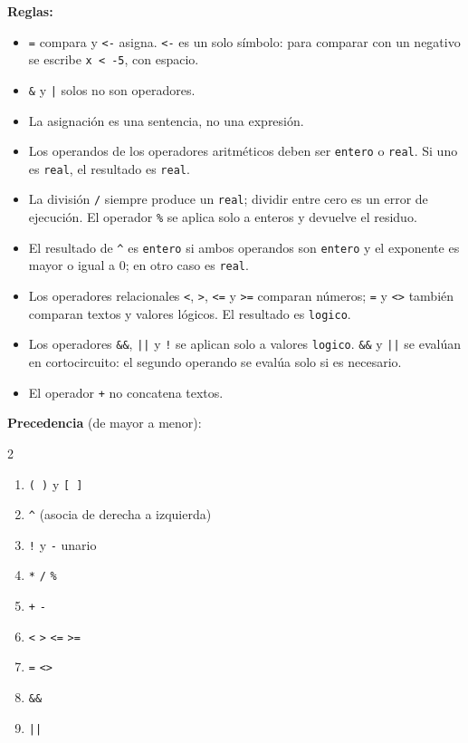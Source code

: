 \documentclass[spanish,11pt,letterpaper]{article}
\begin{document}
	\textbf{Reglas:}
	\begin{itemize}
		\item \texttt{=} compara y \texttt{<-} asigna. \texttt{<-} es un solo
		s\'imbolo: para comparar con un negativo se escribe
		\texttt{x < -5}, con espacio.
		\item \texttt{\&} y \texttt{|} solos no son operadores.
		\item La asignaci\'on es una sentencia, no una expresi\'on.
		\item Los operandos de los operadores aritm\'eticos deben ser
		\texttt{entero} o \texttt{real}. Si uno es \texttt{real}, el
		resultado es \texttt{real}.
		\item La divisi\'on \texttt{/} siempre produce un \texttt{real}; dividir
		entre cero es un error de ejecuci\'on. El operador \texttt{\%}
		se aplica solo a enteros y devuelve el residuo.
		\item El resultado de \texttt{\textasciicircum} es \texttt{entero} si
		ambos operandos son \texttt{entero} y el exponente es mayor o
		igual a 0; en otro caso es \texttt{real}.
		\item Los operadores relacionales \texttt{<}, \texttt{>}, \texttt{<=} y
		\texttt{>=} comparan n\'umeros; \texttt{=} y \texttt{<>} tambi\'en
		comparan textos y valores l\'ogicos. El resultado es
		\texttt{logico}.
		\item Los operadores \texttt{\&\&}, \texttt{||} y \texttt{!} se aplican
		solo a valores \texttt{logico}. \texttt{\&\&} y \texttt{||} se
		eval\'uan en cortocircuito: el segundo operando se eval\'ua solo
		si es necesario.
		\item El operador \texttt{+} no concatena textos.
	\end{itemize}
	
	\smallskip

	\textbf{Precedencia} (de mayor a menor):
	\begin{multicols}{2}
		\begin{enumerate}
			\item \texttt{( )} y \texttt{[ ]}
			\item \texttt{\textasciicircum} (asocia de derecha a izquierda)
			\item \texttt{!} y \texttt{-} unario
			\item \texttt{*} \; \texttt{/} \; \texttt{\%}
			\item \texttt{+} \; \texttt{-}
			\item \texttt{<} \; \texttt{>} \; \texttt{<=} \; \texttt{>=}
			\item \texttt{=} \; \texttt{<>}
			\item \texttt{\&\&}
			\item \texttt{||}
		\end{enumerate}
	\end{multicols}
	
\end{document}
